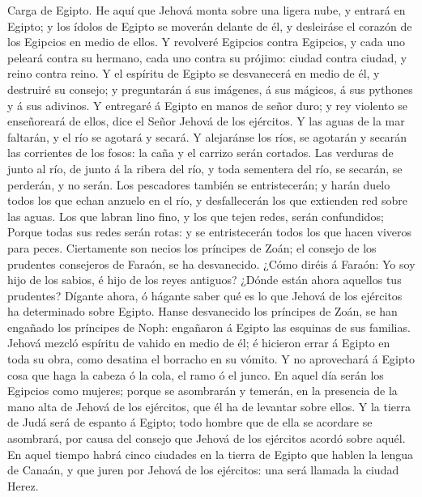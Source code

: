  Carga de Egipto. He aquí que Jehová monta sobre una ligera
nube, y entrará en Egipto; y los ídolos de Egipto se moverán delante de
él, y desleiráse el corazón de los Egipcios en medio de ellos.
 Y revolveré Egipcios contra Egipcios, y cada uno peleará
contra su hermano, cada uno contra su prójimo: ciudad contra ciudad, y
reino contra reino.  Y el espíritu de Egipto se desvanecerá
en medio de él, y destruiré su consejo; y preguntarán á sus imágenes, á
sus mágicos, á sus pythones y á sus adivinos.  Y entregaré á
Egipto en manos de señor duro; y rey violento se enseñoreará de ellos,
dice el Señor Jehová de los ejércitos.  Y las aguas de la
mar faltarán, y el río se agotará y secará.  Y alejaránse
los ríos, se agotarán y secarán las corrientes de los fosos: la caña y
el carrizo serán cortados.  Las verduras de junto al río, de
junto á la ribera del río, y toda sementera del río, se secarán, se
perderán, y no serán.  Los pescadores también se
entristecerán; y harán duelo todos los que echan anzuelo en el río, y
desfallecerán los que extienden red sobre las aguas.  Los
que labran lino fino, y los que tejen redes, serán confundidos;
 Porque todas sus redes serán rotas: y se entristecerán
todos los que hacen viveros para peces.  Ciertamente son
necios los príncipes de Zoán; el consejo de los prudentes consejeros de
Faraón, se ha desvanecido. ¿Cómo diréis á Faraón: Yo soy hijo de los
sabios, é hijo de los reyes antiguos?  ¿Dónde están ahora
aquellos tus prudentes? Dígante ahora, ó hágante saber qué es lo que
Jehová de los ejércitos ha determinado sobre Egipto.  Hanse
desvanecido los príncipes de Zoán, se han engañado los príncipes de
Noph: engañaron á Egipto las esquinas de sus familias. 
Jehová mezcló espíritu de vahido en medio de él; é hicieron errar á
Egipto en toda su obra, como desatina el borracho en su vómito.
 Y no aprovechará á Egipto cosa que haga la cabeza ó la
cola, el ramo ó el junco.  En aquel día serán los Egipcios
como mujeres; porque se asombrarán y temerán, en la presencia de la mano
alta de Jehová de los ejércitos, que él ha de levantar sobre ellos.
 Y la tierra de Judá será de espanto á Egipto; todo hombre
que de ella se acordare se asombrará, por causa del consejo que Jehová
de los ejércitos acordó sobre aquél.  En aquel tiempo habrá
cinco ciudades en la tierra de Egipto que hablen la lengua de Canaán, y
que juren por Jehová de los ejércitos: una será llamada la ciudad Herez.
